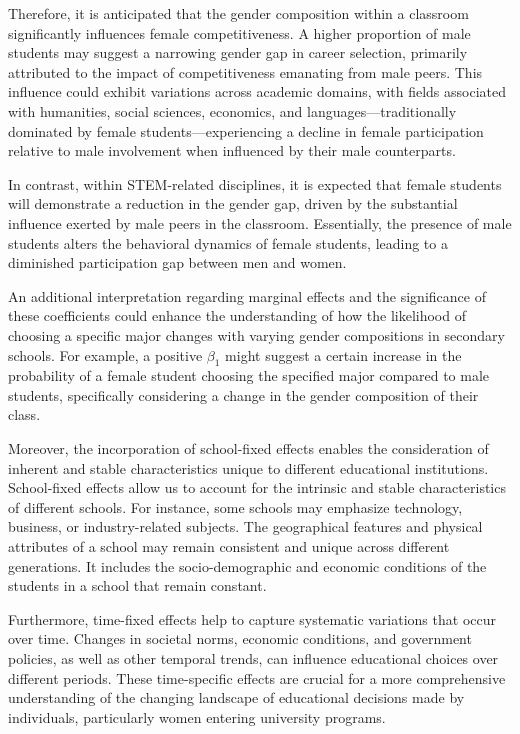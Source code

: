 Therefore, it is anticipated that the gender composition within a classroom significantly influences female competitiveness. A higher proportion of male students may suggest a narrowing gender gap in career selection, primarily attributed to the impact of competitiveness emanating from male peers. This influence could exhibit variations across academic domains, with fields associated with humanities, social sciences, economics, and languages—traditionally dominated by female students—experiencing a decline in female participation relative to male involvement when influenced by their male counterparts.

In contrast, within STEM-related disciplines, it is expected that female students will demonstrate a reduction in the gender gap, driven by the substantial influence exerted by male peers in the classroom. Essentially, the presence of male students alters the behavioral dynamics of female students, leading to a diminished participation gap between men and women.

 

An additional interpretation regarding marginal effects and the significance of these coefficients could enhance the understanding of how the likelihood of choosing a specific major changes with varying gender compositions in secondary schools. For example, a positive \(\beta_1\) might suggest a certain increase in the probability of a female student choosing the specified major compared to male students, specifically considering a change in the gender composition of their class.

Moreover, the incorporation of school-fixed effects enables the consideration of inherent and stable characteristics unique to different educational institutions.
School-fixed effects allow us to account for the intrinsic and stable characteristics of different schools. For instance, some schools may emphasize technology, business, or industry-related subjects. The geographical features and physical attributes of a school may remain consistent and unique across different generations. It includes the socio-demographic and economic conditions of the students in a school that remain constant.

Furthermore, time-fixed effects help to capture systematic variations that occur over time. Changes in societal norms, economic conditions, and government policies, as well as other temporal trends, can influence educational choices over different periods. These time-specific effects are crucial for a more comprehensive understanding of the changing landscape of educational decisions made by individuals, particularly women entering university programs.


